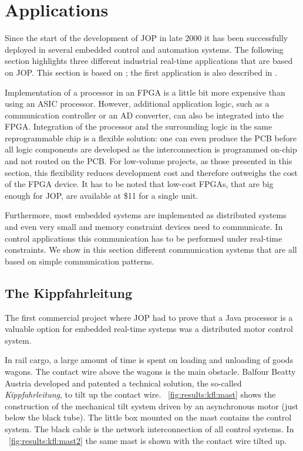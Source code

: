 \section{Applications}
\label{sec:applications}


Since the start of the development of JOP in late 2000 it has been
successfully deployed in several embedded control and automation
systems. The following section highlights three different industrial
real-time applications that are based on JOP. This section is based
on \cite{jop:app}; the first application is also described in
\cite{jop:wises03}.

Implementation of a processor in an FPGA is a little bit more
expensive than using an ASIC processor. However, additional
application logic, such as a communication controller or an AD
converter, can also be integrated into the FPGA. Integration of the
processor and the surrounding logic in the same reprogrammable chip
is a flexible solution: one can even produce the PCB before all logic
components are developed as the interconnection is programmed on-chip
and not routed on the PCB. For low-volume projects, as those
presented in this section, this flexibility reduces development cost
and therefore outweighs the cost of the FPGA device. It has to be
noted that low-cost FPGAs, that are big enough for JOP, are available
at \$11 for a single unit.

Furthermore, most embedded systems are implemented as distributed
systems and even very small and memory constraint devices need to
communicate. In control applications this communication has to be
performed under real-time constraints. We show in this section
different communication systems that are all based on simple
communication patterns.

\subsection{The Kippfahrleitung}
\label{sec:app:kfl}

The first commercial project where JOP had to prove that a Java
processor is a valuable option for embedded real-time systems was a
distributed motor control system.

In rail cargo, a large amount of time is spent on loading and
unloading of goods wagons. The contact wire above the wagons is the
main obstacle. Balfour Beatty Austria developed and patented a
technical solution, the so-called \emph{Kippfahrleitung}, to tilt up
the contact wire. \figurename~\ref{fig:results:kfl:mast} shows the
construction of the mechanical tilt system driven by an asynchronous
motor (just below the black tube). The little box mounted on the mast
contains the control system. The black cable is the network
interconnection of all control systems. In
\figurename~\ref{fig:results:kfl:mast2} the same mast is shown with
the contact wire tilted up.

